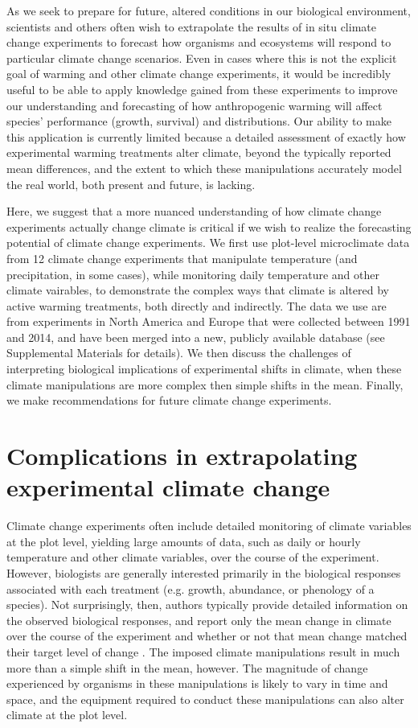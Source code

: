 \documentclass{article}
\begin{document}
\par As we seek to prepare for future, altered conditions in our biological environment, scientists and others often wish to extrapolate the results of in situ climate change experiments to forecast how organisms and ecosystems will respond to particular climate change scenarios. Even in cases where this is not the explicit goal of warming and other climate change experiments, it would be incredibly useful to be able to apply knowledge gained from these experiments to improve our understanding and forecasting of how anthropogenic warming will affect species' performance (growth, survival) and distributions. Our ability to make this application is currently limited because a detailed assessment of exactly how experimental warming treatments alter climate, beyond the typically reported mean differences, and the extent to which these manipulations accurately model the real world, both present and future, is lacking. 
\par Here, we suggest that a more nuanced understanding of how climate change experiments actually change climate is critical if we wish to realize the forecasting potential of climate change experiments. We first use plot-level microclimate data from 12 climate change experiments that manipulate temperature (and precipitation, in some cases), while monitoring daily temperature and other climate vairables, to demonstrate the complex ways that climate is altered by active warming treatments, both directly and indirectly. The data we use are from experiments in North America and Europe that were collected between 1991 and 2014, and have been merged into a new, publicly available database (see Supplemental Materials for details). We then discuss the challenges of interpreting biological implications of experimental shifts in climate, when these climate manipulations are more complex then simple shifts in the mean. Finally, we make recommendations for future climate change experiments.

\section* {Complications in extrapolating experimental climate change}
Climate change experiments often include detailed monitoring of climate variables at the plot level, yielding large amounts of data, such as daily or hourly temperature and other climate variables, over the course of the experiment. However, biologists are generally interested primarily in the biological responses associated with each treatment (e.g. growth, abundance, or phenology of a species). Not surprisingly, then, authors typically provide detailed information on the observed biological responses, and report only the mean change in climate over the course of the experiment and whether or not that mean change matched their target level of change \citep{price1998,clark2014a,clark2014b,rollinson2012}. The imposed climate manipulations result in much more than a simple shift in the mean, however. The magnitude of change experienced by organisms in these manipulations is likely to vary in time and space, and the equipment required to conduct these manipulations can also alter climate at the plot level. 
\end{document}
